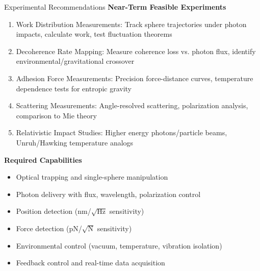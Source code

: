 \documentclass{beamer}
\begin{document}
\begin{frame}{Experimental Recommendations}
\textbf{Near-Term Feasible Experiments}
\begin{enumerate}
\item Work Distribution Measurements: Track sphere trajectories under photon impacts, calculate work, test fluctuation theorems
\item Decoherence Rate Mapping: Measure coherence loss vs. photon flux, identify environmental/gravitational crossover
\item Adhesion Force Measurements: Precision force-distance curves, temperature dependence tests for entropic gravity
\item Scattering Measurements: Angle-resolved scattering, polarization analysis, comparison to Mie theory
\item Relativistic Impact Studies: Higher energy photons/particle beams, Unruh/Hawking temperature analogs
\end{enumerate}

\textbf{Required Capabilities}
\begin{itemize}
\item Optical trapping and single-sphere manipulation
\item Photon delivery with flux, wavelength, polarization control
\item Position detection (nm/$\sqrt{\text{Hz}}$ sensitivity)
\item Force detection (pN/$\sqrt{\text{N}}$ sensitivity)
\item Environmental control (vacuum, temperature, vibration isolation)
\item Feedback control and real-time data acquisition
\end{itemize}
\end{frame}
\end{document}
